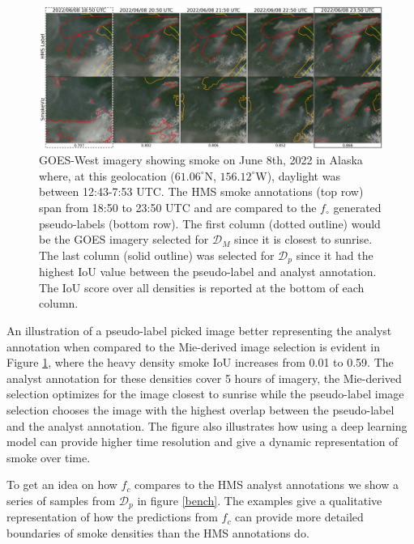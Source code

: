 \documentclass{article}
\begin{document}
\begin{figure}
    \centering
    \includegraphics[width=\linewidth]{figures/final_results_small.png}
    \caption{GOES-West imagery showing smoke on June 8th, 2022 in Alaska where, at this geolocation (\(61.06^{\circ}\)N, \(156.12^{\circ}\)W), daylight was between 12:43-7:53 UTC. The HMS smoke annotations (top row) span from 18:50 to 23:50 UTC and are compared to the \(f_{\circ}\) generated pseudo-labels (bottom row). The first column (dotted outline) would be the GOES imagery selected for \(\mathcal{D}_{M}\) since it is closest to sunrise. The last column (solid outline) was selected for \(\mathcal{D}_{p}\) since it had the highest IoU value between the pseudo-label and analyst annotation. The IoU score over all densities is reported at the bottom of each column.}
    \label{ml_vs_mei}
\end{figure}

An illustration of a pseudo-label picked image better representing the analyst annotation when compared to the Mie-derived image selection is evident in Figure \ref{ml_vs_mei}, where the heavy density smoke IoU increases from 0.01 to 0.59. The analyst annotation for these densities cover 5 hours of imagery, the Mie-derived selection optimizes for the image closest to sunrise while the pseudo-label image selection chooses the image with the highest overlap between the pseudo-label and the analyst annotation. The figure also illustrates how using a deep learning model can provide higher time resolution and give a dynamic representation of smoke over time.

To get an idea on how \(f_{c}\) compares to the HMS analyst annotations we show a series of samples from \(\mathcal{D}_{p}\) in figure \ref{bench}. The examples give a qualitative representation of how the predictions from \(f_c\) can provide more detailed boundaries of smoke densities than the HMS annotations do.
\end{document}
